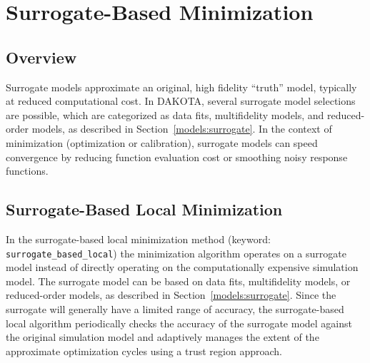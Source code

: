 \chapter{Surrogate-Based Minimization}\label{sbm}

\section{Overview}\label{sbm:overview}

Surrogate models approximate an original, high fidelity ``truth''
model, typically at reduced computational cost.  In DAKOTA, several
surrogate model selections are possible, which are categorized as data
fits, multifidelity models, and reduced-order models, as described in
Section~\ref{models:surrogate}.  In the context of minimization
(optimization or calibration), surrogate models can speed convergence
by reducing function evaluation cost or smoothing noisy response
functions.

\section{Surrogate-Based Local Minimization}\label{sbm:sblm}

In the surrogate-based local minimization method (keyword:
\texttt{surrogate\_based\_local}) the minimization algorithm operates on
a surrogate model instead of directly operating on the computationally
expensive simulation model. The surrogate model can be based on data
fits, multifidelity models, or reduced-order models, as described in
Section~\ref{models:surrogate}. Since the surrogate will generally
have a limited range of accuracy, the surrogate-based local algorithm
periodically checks the accuracy of the surrogate model against the
original simulation model and adaptively manages the extent of the
approximate optimization cycles using a trust region approach.


